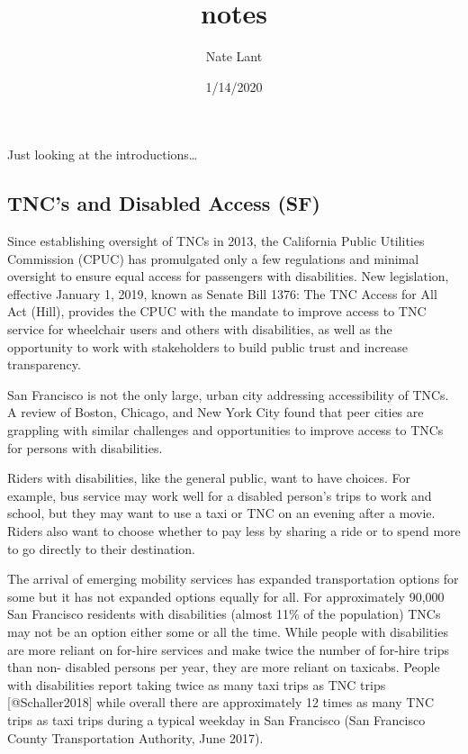 \documentclass[]{article}
\title{notes}
\author{Nate Lant}
\date{1/14/2020}
\begin{document}
\maketitle

Just looking at the introductions\ldots{}

\hypertarget{tncs-and-disabled-access-sf}{%
\subsection{TNC's and Disabled Access
(SF)}\label{tncs-and-disabled-access-sf}}

Since establishing oversight of TNCs in 2013, the California Public
Utilities Commission (CPUC) has promulgated only a few regulations and
minimal oversight to ensure equal access for passengers with
disabilities. New legislation, effective January 1, 2019, known as
Senate Bill 1376: The TNC Access for All Act (Hill), provides the CPUC
with the mandate to improve access to TNC service for wheelchair users
and others with disabilities, as well as the opportunity to work with
stakeholders to build public trust and increase transparency.

San Francisco is not the only large, urban city addressing accessibility
of TNCs. A review of Boston, Chicago, and New York City found that peer
cities are grappling with similar challenges and opportunities to
improve access to TNCs for persons with disabilities.

Riders with disabilities, like the general public, want to have choices.
For example, bus service may work well for a disabled person's trips to
work and school, but they may want to use a taxi or TNC on an evening
after a movie. Riders also want to choose whether to pay less by sharing
a ride or to spend more to go directly to their destination.

The arrival of emerging mobility services has expanded transportation
options for some but it has not expanded options equally for all. For
approximately 90,000 San Francisco residents with disabilities (almost
11\% of the population) TNCs may not be an option either some or all the
time. While people with disabilities are more reliant on for-hire
services and make twice the number of for-hire trips than non- disabled
persons per year, they are more reliant on taxicabs. People with
disabilities report taking twice as many taxi trips as TNC trips
{[}@Schaller2018{]} while overall there are approximately 12 times as
many TNC trips as taxi trips during a typical weekday in San Francisco
(San Francisco County Transportation Authority, June 2017).
\end{document}
